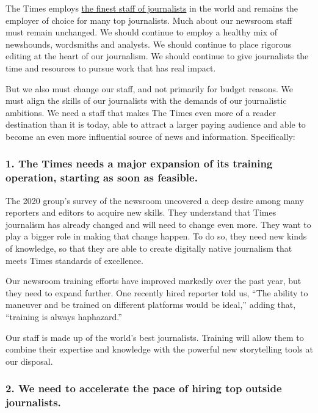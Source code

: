 The Times employs \href{http://www.nytco.com/pulitzer-prizes/}{the
finest staff of journalists} in the world and remains the employer of
choice for many top journalists. Much about our newsroom staff must
remain unchanged. We should continue to employ a healthy mix of
newshounds, wordsmiths and analysts. We should continue to place
rigorous editing at the heart of our journalism. We should continue to
give journalists the time and resources to pursue work that has real
impact.

But we also must change our staff, and not primarily for budget reasons.
We must align the skills of our journalists with the demands of our
journalistic ambitions. We need a staff that makes The Times even more
of a reader destination than it is today, able to attract a larger
paying audience and able to become an even more influential source of
news and information. Specifically:

\hypertarget{1-the-times-needs-a-major-expansion-of-its-training-operation-starting-as-soon-as-feasible}{%
\subsubsection{1. The Times needs a major expansion of its training
operation, starting as soon as
feasible.}\label{1-the-times-needs-a-major-expansion-of-its-training-operation-starting-as-soon-as-feasible}}

The 2020 group's survey of the newsroom uncovered a deep desire among
many reporters and editors to acquire new skills. They understand that
Times journalism has already changed and will need to change even more.
They want to play a bigger role in making that change happen. To do so,
they need new kinds of knowledge, so that they are able to create
digitally native journalism that meets Times standards of excellence.

Our newsroom training efforts have improved markedly over the past year,
but they need to expand further. One recently hired reporter told us,
``The ability to maneuver and be trained on different platforms would be
ideal,'' adding that, ``training is always haphazard.''

Our staff is made up of the world's best journalists. Training will
allow them to combine their expertise and knowledge with the powerful
new storytelling tools at our disposal.

\hypertarget{2-we-need-to-accelerate-the-pace-of-hiring-top-outside-journalists}{%
\subsubsection{2. We need to accelerate the pace of hiring top outside
journalists.}\label{2-we-need-to-accelerate-the-pace-of-hiring-top-outside-journalists}}

